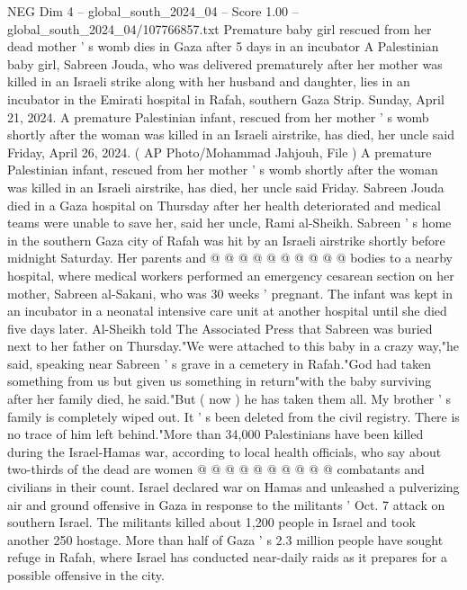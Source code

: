 \begin{textsample}{NEG Dim 4 – global\_south\_2024\_04 – Score 1.00 – global\_south\_2024\_04/107766857.txt}  \label{ex:f4_neg_198}
Premature baby girl rescued from her dead mother ' s womb dies in Gaza after 5 days in an incubator A Palestinian baby girl, Sabreen Jouda, who was delivered prematurely after her mother was killed in an Israeli strike along with her husband and daughter, lies in an incubator in the Emirati hospital in Rafah, southern Gaza Strip.
Sunday, April 21, 2024.
A premature Palestinian infant, rescued from her mother ' s womb shortly after the woman was killed in an Israeli airstrike, has died, her uncle said Friday, April 26, 2024. ( AP Photo/Mohammad Jahjouh, File ) A premature Palestinian infant, rescued from her mother ' s womb shortly after the woman was killed in an Israeli airstrike, has died, her uncle said Friday.
Sabreen Jouda died in a Gaza hospital on Thursday after her health deteriorated and medical teams were unable to save her, said her uncle, Rami al-Sheikh.
Sabreen ' s home in the southern Gaza city of Rafah was hit by an Israeli airstrike shortly before midnight Saturday.
Her parents and @ @ @ @ @ @ @ @ @ @ bodies to a nearby hospital, where medical workers performed an emergency cesarean section on her mother, Sabreen al-Sakani, who was 30 weeks ' pregnant.
The infant was kept in an incubator in a neonatal intensive care unit at another hospital until she died five days later.
Al-Sheikh told The Associated Press that Sabreen was buried next to her father on Thursday."We were attached to this baby in a crazy way,"he said, speaking near Sabreen ' s grave in a cemetery in Rafah."God had taken something from us but given us something in return"with the baby surviving after her family died, he said."But ( now ) he has taken them all.
My brother ' s family is completely wiped out.
It ' s been deleted from the civil registry.
There is no trace of him left behind."More than 34,000 Palestinians have been killed during the Israel-Hamas war, according to local health officials, who say about two-thirds of the dead are women @ @ @ @ @ @ @ @ @ @ combatants and civilians in their count.
Israel declared war on Hamas and unleashed a pulverizing air and ground offensive in Gaza in response to the militants ' Oct. 7 attack on southern Israel.
The militants killed about 1,200 people in Israel and took another 250 hostage.
More than half of Gaza ' s 2.3 million people have sought refuge in Rafah, where Israel has conducted near-daily raids as it prepares for a possible offensive in the city.

\end{textsample}
